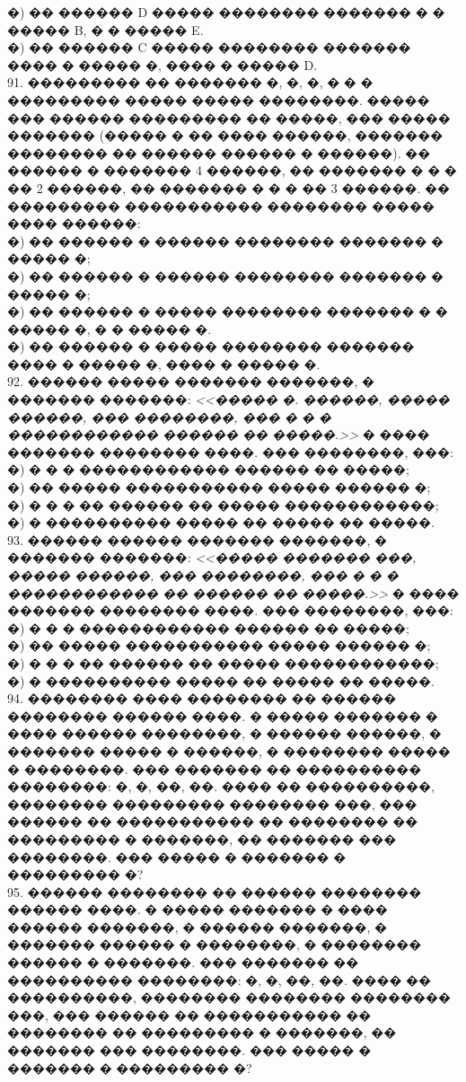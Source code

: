 \documentclass[12pt]{article}
\begin{document}
�) �� ������ D ����� �������� ������� � � ����� B, � � ����� E.\\
�) �� ������ C ����� �������� ������� ���� � ����� �, ���� � ����� D.\\
91. ��������� �� ������� �, �, �, � � � ��������� ����� ����� ��������. ����� ��� ������ ��������� �� �����, ��� ����� ������� (����� � �� ���� ������, ������� �������� �� ������ ������ � ������). �� ������ � ������� 4 ������, �� ������� � � � �� 2 ������, �� ������� � � � �� 3 ������. �� ��������� ����������� �������� ����� ���� ������:\\
�) �� ������ � ������ �������� ������� � ����� �;\\
�) �� ������ � ������ �������� ������� � ����� �;\\
�) �� ������ � ����� �������� ������� � � ����� �, � � ����� �.\\
�) �� ������ � ����� �������� ������� ���� � ����� �, ���� � ����� �.\\
92. ������ ����� ������� �������, � ������� �������: {\it <<����� �. ������, ����� ������, ��� ��������, ��� � � � ������������ ������ �� �����.>>} � ���� ������� �������� ����. ��� ��������, ���:\\
�) � � � ������������ ������ �� �����;\\
�) �� ����� ����������� ����� ������ �;\\
�) � � � �� ������ �� ����� ������������;\\
�) � ���������� ����� �� ����� �� �����.\\
93. ������ ������ ������� �������, � ������� �������: {\it <<����� ������� ���, ����� ������, ��� ��������, ��� � � � ������������ �� ������ �� �����.>>} � ���� ������� �������� ����. ��� ��������, ���:\\
�) � � � ������������ ������ �� �����;\\
�) �� ����� ����������� ����� ������ �;\\
�) � � � �� ������ �� ����� ������������;\\
�) � ���������� ����� �� ����� �� �����.\\
94. �������� ���� �������� �� ������ �������� ������ ����. � ����� ������� � ���� ������ ��������, � ������ ������, � ������� ����� � ������, � �������� ����� � ��������. ��� ������� �� ���������� ��������: �, �, ��, ��. ���� �� ����������, �������� ��������� �������� ���, ��� ������ �� ����������� �� �������� �� ��������� � �������, �� ������� ��� ��������. ��� ����� � ������� � ��������� �?\\
95. ������ �������� �� ������ �������� ������ ����. � ����� ������� � ���� ������ �������, � ������ �������, � ������� ������ � ��������, � �������� ������ � �������. ��� ������� �� ���������� ��������: �, �, ��, ��. ���� �� ����������, �������� �������� �������� ���, ��� ������ �� ����������� �� �������� �� ��������� � �������, �� ������� ��� ��������. ��� ����� � ������� � ��������� �?\\
\end{document}
